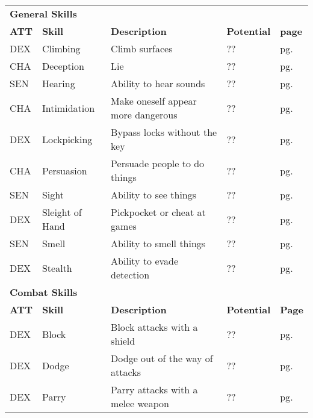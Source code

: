 


\begin{table}[h!]
    \unclassedrowcolors
    \begin{tabular}{l l l l l}
        \multicolumn{5}{l}{\bfseries{General Skills}} \\
        \bfseries{ATT} & \bfseries{Skill} & \bfseries{Description} & \bfseries{Potential} & \bfseries{page} \\
        DEX & Climbing & Climb surfaces & ?? & pg. \pageref{skill:climbing} \\
        CHA & Deception & Lie & ?? & pg. \pageref{skill:deception} \\
        SEN & Hearing & Ability to hear sounds & ?? & pg. \pageref{skill:hearing} \\
        CHA & Intimidation & Make oneself appear more dangerous & ?? & pg. \pageref{skill:intimidation} \\
        DEX & Lockpicking & Bypass locks without the key & ?? & pg. \pageref{skill:lockpicking} \\
        CHA & Persuasion & Persuade people to do things & ?? & pg. \pageref{skill:persuasion} \\
        SEN & Sight & Ability to see things & ?? & pg. \pageref{skill:sight} \\
        DEX & Sleight of Hand & Pickpocket or cheat at games & ?? & pg. \pageref{skill:sleight-of-hand} \\
        SEN & Smell & Ability to smell things & ?? & pg. \pageref{skill:smell} \\
        DEX & Stealth & Ability to evade detection & ?? & pg. \pageref{skill:stealth} \\
        \multicolumn{5}{l}{\bfseries{Combat Skills}} \\
        \bfseries{ATT} & \bfseries{Skill} & \bfseries{Description} & \bfseries{Potential} & \bfseries{Page} \\
        DEX & Block & Block attacks with a shield & ?? & pg. \pageref{skill:block} \\
        DEX & Dodge & Dodge out of the way of attacks & ?? & pg. \pageref{skill:dodge} \\
        DEX & Parry & Parry attacks with a melee weapon & ?? & pg. \pageref{skill:parry} \\

\end{tabular}
\end{table}
